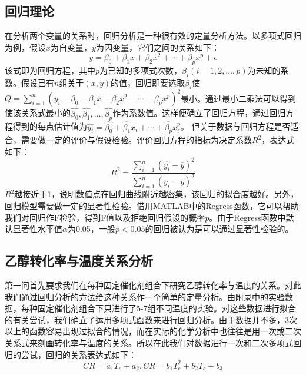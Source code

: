 \documentclass{article}
\begin{document}
	\subsection{回归理论}
	在分析两个变量的关系时，回归分析是一种很有效的定量分析方法。以多项式回归为例，假设$x$为自变量，$y$为因变量，它们之间的关系如下：
	\begin{equation}
		y=\beta_0 +\beta_1 x+\beta_2 x^2+\cdots+\beta_p x^p+\epsilon
	\end{equation}
	该式即为回归方程，其中$p$为已知的多项式次数，$\beta_i(i=1,2,\dots,p)$为未知的系数。假设已有$n$组关于$(x,y)$的值，回归即要选取$\beta_i$使$Q=\sum_{i=1}^n(y_i-\beta_0 -\beta_1 x-\beta_2 x^2-\cdots-\beta_px^p)^2$最小。通过最小二乘法可以得到使该关系式最小的$\hat{\beta_0},\hat{\beta_1},\dots,\hat{\beta_p}$作为系数值。这样便确立了回归方程，通过回归方程得到的每点估计值为$\hat{y_i}=\hat{\beta_0}+\hat{\beta_1}x_i+\cdots+\hat{\beta_p}x_i^p$。
	但关于数据与回归方程是否适合，需要做一定的评价与假设检验。评价回归方程的指标为决定系数$R^2$，表达式如下：
	\begin{equation}
		R^2=\frac{\sum_{i=1}^n(\hat{y_i}-\overline{y})^2}{\sum_{i=1}^n(y_i-\overline{y})^2}
	\end{equation}
	$R^2$越接近于1，说明数值点在回归曲线附近越密集，该回归的拟合度越好。另外，回归模型需要做一定的显著性检验。借用MATLAB中的Regress函数，它可以帮助我们对回归作F检验，得到F值以及拒绝回归假设的概率$p$。由于Regress函数中默认显著性水平值$\alpha$为0.05，一般$p<0.05$的回归被认为是可以通过显著性检验的。
	\subsection{乙醇转化率与温度关系分析}
	第一问首先要求我们在每种固定催化剂组合下研究乙醇转化率与温度的关系。对此我们通过回归分析的方法给这种关系作一个简单的定量分析。由附录中的实验数据，每种固定催化剂组合下只进行了5-7组不同温度的实验。对这些数据进行拟合的有关尝试，我们确立了运用多项式函数来进行回归分析。由于数据并不多，3次以上的函数容易出现过拟合的情况，而在实际的化学分析中也往往是用一次或二次关系式来刻画转化率与温度的关系。所以在此我们对数据进行一次和二次多项式回归的尝试，回归的关系表达式如下：
	\begin{equation}
		CR=a_1T_c+a_2,CR=b_1T_c^2+b_2T_c+b_3
	\end{equation}
\end{document}
